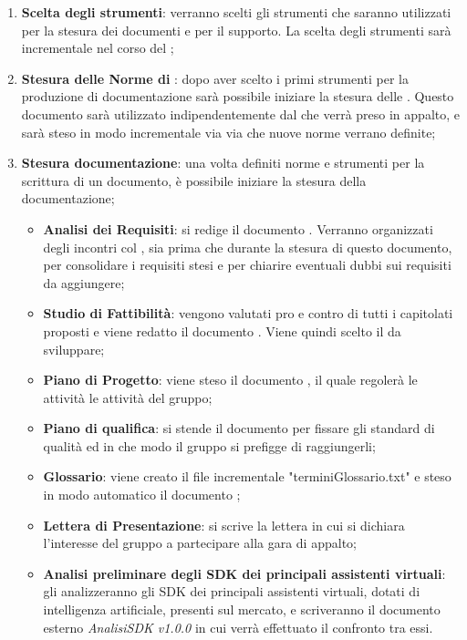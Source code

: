 \documentclass[./PianoDiProgetto.tex]{subfiles}
\begin{document}
  \begin{enumerate}
		\item \textbf{Scelta degli strumenti}: verranno scelti gli strumenti che saranno utilizzati per la stesura dei documenti e per il supporto. La scelta degli strumenti sarà incrementale nel corso del ;
		\item \textbf{Stesura delle Norme di }: dopo aver scelto i primi strumenti per la produzione di documentazione sarà possibile iniziare la stesura delle \NPdocRR. Questo documento sarà utilizzato indipendentemente dal  che verrà preso in appalto, e sarà steso in modo incrementale via via che nuove norme verrano definite;
		\item \textbf{Stesura documentazione}: una volta definiti norme e strumenti per la scrittura di un documento, è possibile iniziare la stesura della documentazione;
    \begin{itemize}
      \item \textbf{Analisi dei Requisiti}: si redige il documento \ARdocRR. Verranno organizzati degli incontri col , sia prima che durante la stesura di questo documento, per consolidare i requisiti stesi e per chiarire eventuali dubbi sui requisiti da aggiungere;
      \item \textbf{Studio di Fattibilità}: vengono valutati pro e contro di tutti i capitolati proposti e viene redatto il documento \SFdocRR. Viene quindi scelto il  da sviluppare;
      \item \textbf{Piano di Progetto}: viene steso il documento \PPdocRR, il quale regolerà le attività le attività del gruppo;
      \item \textbf{Piano di qualifica}: si stende il documento \PQdocRR per fissare gli standard di qualità ed in che modo il gruppo si prefigge di raggiungerli;
      \item \textbf{Glossario}: viene creato il file incrementale "terminiGlossario.txt" e steso in modo automatico il documento \GldocRR;
      \item \textbf{Lettera di Presentazione}: si scrive la lettera in cui si dichiara l'interesse del gruppo a partecipare alla gara di appalto;
      \item \textbf{Analisi preliminare degli SDK dei principali assistenti virtuali}: gli \ANP{} analizzeranno gli SDK dei principali assistenti virtuali, dotati di intelligenza artificiale, presenti sul mercato, e scriveranno il documento esterno \textit{AnalisiSDK v1.0.0} in cui verrà effettuato il confronto tra  essi.
    \end{itemize}
  \end{enumerate}
\end{document}

